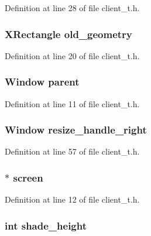 Definition at line 28 of file client\_\-t.h.

\hypertarget{struct_client_aa9f24b399a2592237391d2cdedcb46b3}{
\subsubsection[{old\_\-geometry}]{\setlength{\rightskip}{0pt plus 5cm}XRectangle {\bf old\_\-geometry}}}
\label{struct_client_aa9f24b399a2592237391d2cdedcb46b3}


Definition at line 20 of file client\_\-t.h.

\hypertarget{struct_client_a9222d5f7d6d375ac2c052eefe78af8a3}{
\subsubsection[{parent}]{\setlength{\rightskip}{0pt plus 5cm}Window {\bf parent}}}
\label{struct_client_a9222d5f7d6d375ac2c052eefe78af8a3}


Definition at line 11 of file client\_\-t.h.

\hypertarget{struct_client_aec1bb9007613e9ffd447a4ae4d1e89ff}{
\subsubsection[{resize\_\-handle\_\-right}]{\setlength{\rightskip}{0pt plus 5cm}Window {\bf resize\_\-handle\_\-right}}}
\label{struct_client_aec1bb9007613e9ffd447a4ae4d1e89ff}


Definition at line 57 of file client\_\-t.h.

\hypertarget{struct_client_a09e2e28eee0189347a7dc3406fdd5e6d}{
\subsubsection[{screen}]{$\ast$ {\bf screen}}}
\label{struct_client_a09e2e28eee0189347a7dc3406fdd5e6d}


Definition at line 12 of file client\_\-t.h.

\hypertarget{struct_client_a95840475e96e04931b1f5f0d2d38fad2}{
\subsubsection[{shade\_\-height}]{\setlength{\rightskip}{0pt plus 5cm}int {\bf shade\_\-height}}}
\label{struct_client_a95840475e96e04931b1f5f0d2d38fad2}


